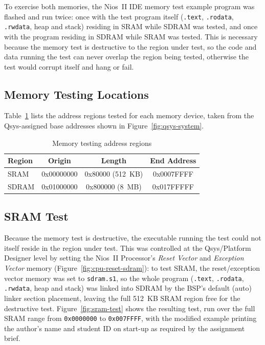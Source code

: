 \documentclass[
    12pt,
    a4paper
]{report}
\begin{document}
To exercise both memories, the Nios~II IDE memory test example program was flashed and run twice:
once with the test program itself (\texttt{.text}, \texttt{.rodata}, \texttt{.rwdata}, heap and
stack) residing in SRAM while SDRAM was tested, and once with the program residing in SDRAM while
SRAM was tested. This is necessary because the memory test is destructive to the region under
test, so the code and data running the test can never overlap the region being tested, otherwise
the test would corrupt itself and hang or fail.

\subsection{Memory Testing Locations}

Table~\ref{tab:mem-regions} lists the address regions tested for each memory device, taken from
the Qsys-assigned base addresses shown in Figure~\ref{fig:qsys-system}.

\begin{table}[H]
    \centering
    \caption{Memory testing address regions}
    \label{tab:mem-regions}
    \begin{tabular}{lccc}
        \toprule
        Region & Origin & Length & End Address \\
        \midrule
        SRAM  & 0x00000000 & 0x80000 (512~KB) & 0x0007FFFF \\
        SDRAM & 0x01000000 & 0x800000 (8~MB)  & 0x017FFFFF \\
        \bottomrule
    \end{tabular}
\end{table}

\subsection{SRAM Test}

Because the memory test is destructive, the executable running the test could not itself reside in
the region under test. This was controlled at the Qsys/Platform Designer level by setting the
Nios~II Processor's \emph{Reset Vector} and \emph{Exception Vector} memory
(Figure~\ref{fig:cpu-reset-sdram}): to test SRAM, the reset/exception vector memory was set to
\texttt{sdram.s1}, so the whole program (\texttt{.text}, \texttt{.rodata}, \texttt{.rwdata}, heap
and stack) was linked into SDRAM by the BSP's default (auto) linker section placement, leaving the
full 512~KB SRAM region free for the destructive test. Figure~\ref{fig:sram-test} shows the
resulting test, run over the full SRAM range from \texttt{0x0000000} to \texttt{0x007FFFF}, with
the modified example printing the author's name and student ID on start-up as required by the
assignment brief.
\end{document}
